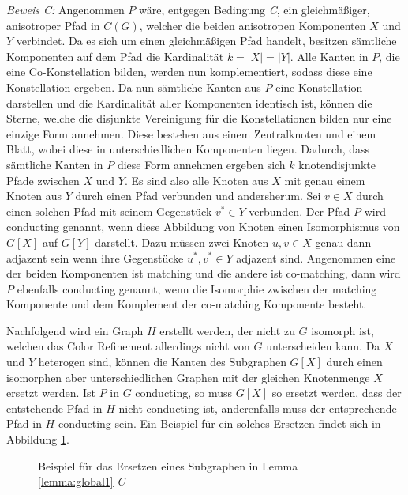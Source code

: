 \emph{Beweis C:} Angenommen $P$ wäre, entgegen Bedingung \emph{C}, ein gleichmäßiger, anisotroper Pfad in $C(G)$, welcher die beiden anisotropen Komponenten $X$ und $Y$ verbindet.
Da es sich um einen gleichmäßigen Pfad handelt, besitzen sämtliche Komponenten auf dem Pfad die Kardinalität $k=|X|=|Y|$.
Alle Kanten in $P$, die eine Co-Konstellation bilden, werden nun komplementiert, sodass diese eine Konstellation ergeben.
Da nun sämtliche Kanten aus $P$ eine Konstellation darstellen und die Kardinalität aller Komponenten identisch ist, können die Sterne, welche die disjunkte Vereinigung für die Konstellationen bilden nur eine einzige Form annehmen.
Diese bestehen aus einem Zentralknoten und einem Blatt, wobei diese in unterschiedlichen Komponenten liegen.
Dadurch, dass sämtliche Kanten in $P$ diese Form annehmen ergeben sich $k$ knotendisjunkte Pfade zwischen $X$ und $Y$.
Es sind also alle Knoten aus $X$ mit genau einem Knoten aus $Y$ durch einen Pfad verbunden und andersherum.
Sei $v\in X$ durch einen solchen Pfad mit seinem Gegenstück $v^*\in Y$ verbunden.
Der Pfad $P$ wird conducting genannt, wenn diese Abbildung von Knoten einen Isomorphismus von $G[X]$ auf $G[Y]$ darstellt.
Dazu müssen zwei Knoten $u,v\in X$ genau dann adjazent sein wenn ihre Gegenstücke $u^*,v^*\in Y$ adjazent sind.
Angenommen eine der beiden Komponenten ist matching und die andere ist co-matching, dann wird $P$ ebenfalls conducting genannt, wenn die Isomorphie zwischen der matching Komponente und dem Komplement der co-matching Komponente besteht.

Nachfolgend wird ein Graph $H$ erstellt werden, der nicht zu $G$ isomorph ist, welchen das Color Refinement allerdings nicht von $G$ unterscheiden kann.
Da $X$ und $Y$ heterogen sind, können die Kanten des Subgraphen $G[X]$ durch einen isomorphen aber unterschiedlichen Graphen mit der gleichen Knotenmenge $X$ ersetzt werden.
Ist $P$ in $G$ conducting, so muss $G[X]$ so ersetzt werden, dass der entstehende Pfad in $H$ nicht conducting ist, anderenfalls muss der entsprechende Pfad in $H$ conducting sein.
Ein Beispiel für ein solches Ersetzen findet sich in Abbildung \ref{fig:global_c}.\\

\begin{figure}[t]
	\centering
	\caption{Beispiel für das Ersetzen eines Subgraphen in Lemma \ref{lemma:global1} \emph{C}}
	\label{fig:global_c}
\end{figure}

